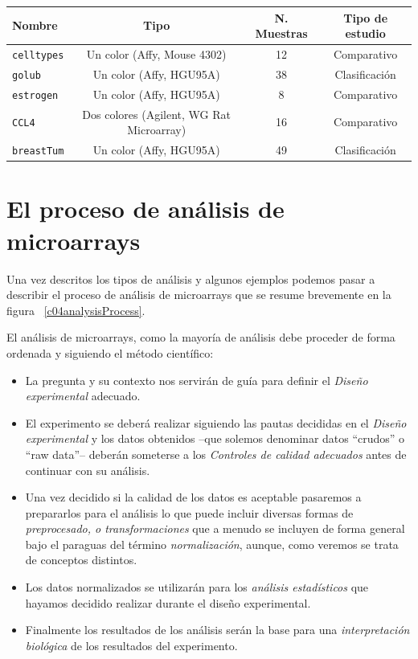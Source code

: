 \begin{table}[!h]
\begin{tabular}{|l|c|c|c|}
\hline
Nombre & Tipo & N. Muestras & Tipo de estudio  \\ \hline
\texttt{celltypes} & Un color (Affy, Mouse 4302) & 12 & Comparativo \\ \hline
\texttt{golub}     & Un color (Affy, HGU95A)  & 38  & Clasificaci\'on \\ \hline
\texttt{estrogen}  & Un color (Affy, HGU95A)  & 8 & Comparativo \\ \hline
\texttt{CCL4}     & Dos colores (Agilent, WG Rat Microarray)    & 16 & Comparativo \\ \hline
\texttt{breastTum} & Un color  (Affy, HGU95A) & 49 & Clasificaci\'on \\ \hline
\end{tabular}
\label{ejemplosEstudios}
\end{table}


\section{El proceso de an\'alisis de microarrays}

Una vez descritos los tipos de an\'alisis y algunos ejemplos podemos pasar a describir el proceso de an\'alisis de microarrays que se resume brevemente en la figura ~\ref{c04analysisProcess}.

El an\'alisis de microarrays, como la mayor\'ia de an\'alisis debe proceder de forma ordenada y siguiendo el m\'etodo cient\'ifico:
\begin{itemize}
\item La pregunta y su contexto nos servir\'an de gu\'ia para definir el \emph{Dise\~no experimental} adecuado.
\item El experimento se deber\'a realizar siguiendo las pautas decididas en el \emph{Dise\~no experimental} y los datos obtenidos
--que solemos denominar datos ``crudos'' o ``raw data''-- deber\'an someterse a los \emph{Controles de calidad adecuados} antes de continuar con su an\'alisis.
\item Una vez decidido si la calidad de los datos es aceptable pasaremos a prepararlos para el an\'alisis lo que puede incluir diversas formas
de \emph{preprocesado, o transformaciones} que a menudo se incluyen de forma general bajo el paraguas del t\'ermino \emph{normalizaci\'on}, aunque, como veremos se trata de conceptos distintos.
\item Los datos normalizados se utilizar\'an para los \emph{an\'alisis estad\'isticos} que hayamos decidido realizar durante el dise\~no experimental.
\item Finalmente los resultados de los an\'alisis ser\'an la base para una \emph{interpretaci\'on biol\'ogica} de los resultados del experimento.
\end{itemize}


